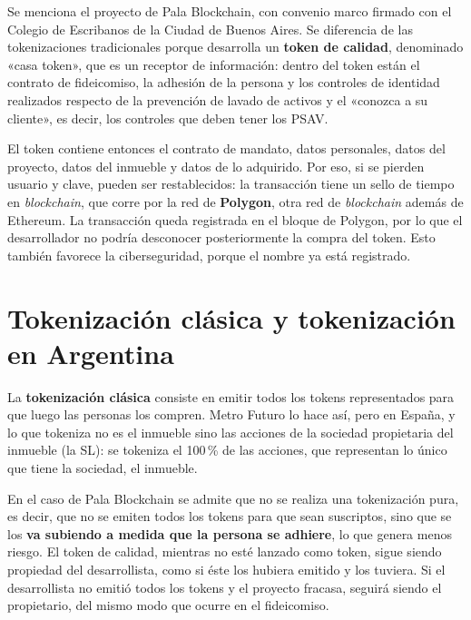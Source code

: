 \documentclass[12pt,oneside]{book}
\begin{document}
Se menciona el proyecto de Pala Blockchain, con convenio marco firmado con el Colegio de Escribanos de la Ciudad de Buenos Aires. Se diferencia de las tokenizaciones tradicionales porque desarrolla un \textbf{token de calidad}, denominado «casa token», que es un receptor de información: dentro del token están el contrato de fideicomiso, la adhesión de la persona y los controles de identidad realizados respecto de la prevención de lavado de activos y el «conozca a su cliente», es decir, los controles que deben tener los PSAV.

El token contiene entonces el contrato de mandato, datos personales, datos del proyecto, datos del inmueble y datos de lo adquirido. Por eso, si se pierden usuario y clave, pueden ser restablecidos: la transacción tiene un sello de tiempo en \textit{blockchain}, que corre por la red de \textbf{Polygon}, otra red de \textit{blockchain} además de Ethereum. La transacción queda registrada en el bloque de Polygon, por lo que el desarrollador no podría desconocer posteriormente la compra del token. Esto también favorece la ciberseguridad, porque el nombre ya está registrado.

\section{Tokenización clásica y tokenización en Argentina}

La \textbf{tokenización clásica} consiste en emitir todos los tokens representados para que luego las personas los compren. Metro Futuro lo hace así, pero en España, y lo que tokeniza no es el inmueble sino las acciones de la sociedad propietaria del inmueble (la SL): se tokeniza el 100\,\% de las acciones, que representan lo único que tiene la sociedad, el inmueble.

En el caso de Pala Blockchain se admite que no se realiza una tokenización pura, es decir, que no se emiten todos los tokens para que sean suscriptos, sino que se los \textbf{va subiendo a medida que la persona se adhiere}, lo que genera menos riesgo. El token de calidad, mientras no esté lanzado como token, sigue siendo propiedad del desarrollista, como si éste los hubiera emitido y los tuviera. Si el desarrollista no emitió todos los tokens y el proyecto fracasa, seguirá siendo el propietario, del mismo modo que ocurre en el fideicomiso.
\end{document}
